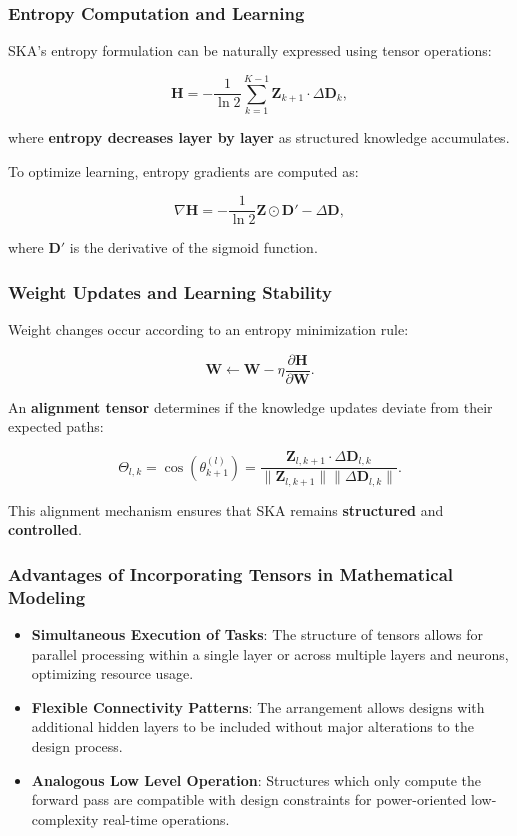 \documentclass{article}
\begin{document}
\subsubsection*{Entropy Computation and Learning}
SKA’s entropy formulation can be naturally expressed using tensor operations:

\[
\mathbf{H} = -\frac{1}{\ln 2} \sum_{k=1}^{K-1} \mathbf{Z}_{k+1} \cdot \Delta \mathbf{D}_k,
\]

where \textbf{entropy decreases layer by layer} as structured knowledge accumulates.

To optimize learning, entropy gradients are computed as:

\[
\nabla \mathbf{H} = -\frac{1}{\ln 2} \mathbf{Z} \odot \mathbf{D}' -\Delta \mathbf{D},
\]

where \textbf{$\mathbf{D}'$} is the derivative of the sigmoid function.

\subsubsection*{Weight Updates and Learning Stability}
Weight changes occur according to an entropy minimization rule:

\[
\mathbf{W} \leftarrow \mathbf{W} - \eta \frac{\partial \mathbf{H}}{\partial \mathbf{W}}.
\]
 
An \textbf{alignment tensor} determines if the knowledge updates deviate from their expected paths:

\[
\Theta_{l,k} = \cos(\theta^{(l)}_{k+1}) = \frac{\mathbf{Z}_{l,k+1} \cdot \Delta \mathbf{D}_{l,k}}{\|\mathbf{Z}_{l,k+1}\| \|\Delta \mathbf{D}_{l,k}\| }.
\]

This alignment mechanism ensures that SKA remains \textbf{structured} and \textbf{controlled}.

\subsubsection*{Advantages of Incorporating Tensors in Mathematical Modeling}

\begin{itemize}

    \item \textbf{Simultaneous Execution of Tasks}: The structure of tensors allows for parallel processing within a single layer or across multiple layers and neurons, optimizing resource usage.
    
    \item \textbf{Flexible Connectivity Patterns}: The arrangement allows designs with additional hidden layers to be included without major alterations to the design process.
    
    \item \textbf{Analogous Low Level Operation}: Structures which only compute the forward pass are compatible with design constraints for power-oriented low-complexity real-time operations.

\end{itemize}
\end{document}
